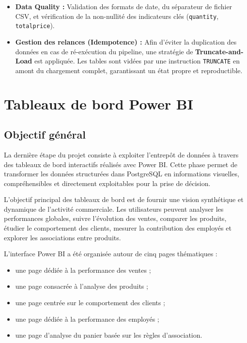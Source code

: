 \documentclass[12pt,a4paper,twoside]{report}
\begin{document}
\begin{itemize}
    \item \textbf{Data Quality :} Validation des formats de date, du séparateur de fichier CSV, et vérification de la non-nullité des indicateurs clés (\texttt{quantity}, \texttt{totalprice}).
    \item \textbf{Gestion des relances (Idempotence) :} Afin d'éviter la duplication des données en cas de ré-exécution du pipeline, une stratégie de \textbf{Truncate-and-Load} est appliquée. Les tables sont vidées par une instruction \texttt{TRUNCATE} en amont du chargement complet, garantissant un état propre et reproductible.
\end{itemize}

\chapter{Tableaux de bord Power BI}

\section{Objectif général}

La dernière étape du projet consiste à exploiter l'entrepôt de données à travers des tableaux de bord interactifs réalisés avec Power BI. Cette phase permet de transformer les données structurées dans PostgreSQL en informations visuelles, compréhensibles et directement exploitables pour la prise de décision.

L'objectif principal des tableaux de bord est de fournir une vision synthétique et dynamique de l'activité commerciale. Les utilisateurs peuvent analyser les performances globales, suivre l'évolution des ventes, comparer les produits, étudier le comportement des clients, mesurer la contribution des employés et explorer les associations entre produits.

L'interface Power BI a été organisée autour de cinq pages thématiques :

\begin{itemize}
  \item une page dédiée à la performance des ventes ;
  \item une page consacrée à l'analyse des produits ;
  \item une page centrée sur le comportement des clients ;
  \item une page dédiée à la performance des employés ;
  \item une page d'analyse du panier basée sur les règles d'association.
\end{itemize}
\end{document}
